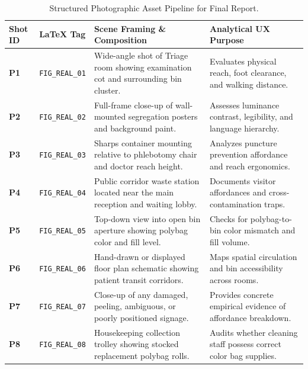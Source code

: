 \documentclass[11pt,a4paper]{article}
\begin{document}
\begin{table}[h!]
\centering
\small
\renewcommand{\arraystretch}{1.2}
\begin{tabularx}{\textwidth}{llp{7.5cm}X}
\toprule
\rowcolor{iitblue}
\color{white}\textbf{Shot ID} & \color{white}\textbf{LaTeX Tag} & \color{white}\textbf{Scene Framing \& Composition} & \color{white}\textbf{Analytical UX Purpose} \\
\midrule
\textbf{P1} & \texttt{FIG\_REAL\_01} & Wide-angle shot of Triage room showing examination cot and surrounding bin cluster. & Evaluates physical reach, foot clearance, and walking distance. \\
\rowcolor{softgray}
\textbf{P2} & \texttt{FIG\_REAL\_02} & Full-frame close-up of wall-mounted segregation posters and background paint. & Assesses luminance contrast, legibility, and language hierarchy. \\
\textbf{P3} & \texttt{FIG\_REAL\_03} & Sharps container mounting relative to phlebotomy chair and doctor reach height. & Analyzes puncture prevention affordance and reach ergonomics. \\
\rowcolor{softgray}
\textbf{P4} & \texttt{FIG\_REAL\_04} & Public corridor waste station located near the main reception and waiting lobby. & Documents visitor affordances and cross-contamination traps. \\
\textbf{P5} & \texttt{FIG\_REAL\_05} & Top-down view into open bin aperture showing polybag color and fill level. & Checks for polybag-to-bin color mismatch and fill volume. \\
\rowcolor{softgray}
\textbf{P6} & \texttt{FIG\_REAL\_06} & Hand-drawn or displayed floor plan schematic showing patient transit corridors. & Maps spatial circulation and bin accessibility across rooms. \\
\textbf{P7} & \texttt{FIG\_REAL\_07} & Close-up of any damaged, peeling, ambiguous, or poorly positioned signage. & Provides concrete empirical evidence of affordance breakdown. \\
\rowcolor{softgray}
\textbf{P8} & \texttt{FIG\_REAL\_08} & Housekeeping collection trolley showing stocked replacement polybag rolls. & Audits whether cleaning staff possess correct color bag supplies. \\
\bottomrule
\end{tabularx}
\caption{Structured Photographic Asset Pipeline for Final Report.}
\end{table}

\end{document}

